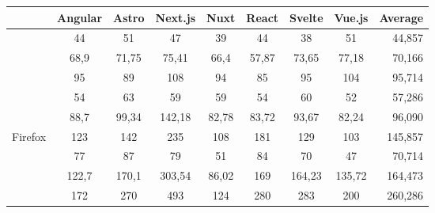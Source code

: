 \documentclass[a4paper, 12pt]{article}
\begin{document}
\begin{table}[h]
  {\footnotesize
  \centering
  \begin{adjustbox}{angle=0}
    {
      \begin{tabular}{|l|c|c|c|c|c|c|c|r|}
        \hline
        ~                                   & \textbf{Angular} & \textbf{Astro}   & \textbf{Next.js}          & \textbf{Nuxt}           & \textbf{React} & \textbf{Svelte} & \textbf{Vue.js} & \textbf{Average} \\ \hline
\rowcolor{white}                                     & 44      & 51                        & 47                        & 39                      & 44      & 38      & 51      & 44,857  \\
\rowcolor{white}                                     & 68,9    & 71,75                     & 75,41                     & 66,4                    & 57,87   & 73,65   & 77,18   & 70,166  \\
\rowcolor{white} \multirow{-3}{*}{Chromium}          & 95      & 89                        & 108                       & 94                      & 85      & 95      & 104     & 95,714  \\ \hline
                                                     & 54      & 63                        & 59                        & 59                      & 54      & 60      & 52      & 57,286  \\
                                                     & 88,7    & 99,34                     & 142,18                    & 82,78                   & 83,72   & 93,67   & 82,24   & 96,090  \\
                 \multirow{-3}{*}{Firefox}           & 123     & 142                       & 235                       & 108                     & 181     & 129     & 103     & 145,857 \\ \hline
\rowcolor{white}                                     & 77      & \cellcolor{red!50}87      & 79                        & 51                      & 84      & 70      & 47      & 70,714  \\
\rowcolor{white}                                     & 122,7   & 170,1                     & \cellcolor{red!50}303,54  & 86,02                   & 169     & 164,23  & 135,72  & 164,473 \\
\rowcolor{white} \multirow{-3}{*}{Desktop Safari}    & 172     & 270                       & \cellcolor{red!50}493     & 124                     & 280     & 283     & 200     & 260,286 \\ \hline

\end{tabular}}
\end{adjustbox}}
\end{table}
\end{document}

